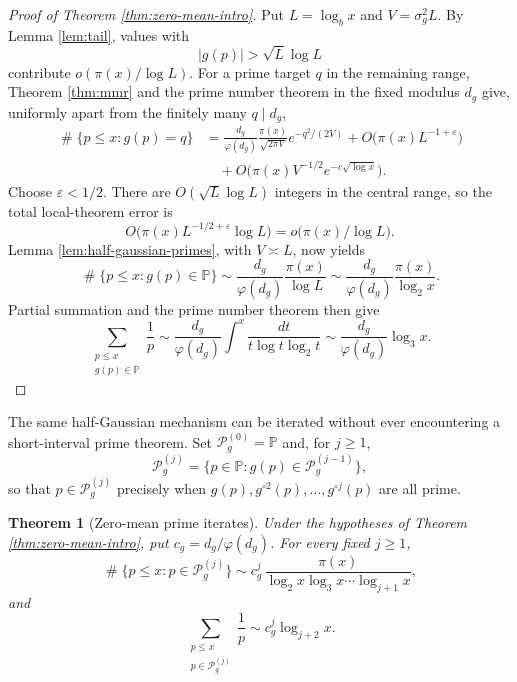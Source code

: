 \documentclass[11pt,reqno]{amsart}
\theoremstyle{plain}
\newtheorem{theorem}{Theorem}[section]
\theoremstyle{definition}
\newcommand{\Pp}{\mathbb{P}}
\newcommand{\eps}{\varepsilon}
\newcommand{\1}{\mathbf 1}
\DeclareMathOperator{\Card}{\#}
\begin{document}
\begin{proof}[Proof of Theorem \ref{thm:zero-mean-intro}]
Put $L=\log_bx$ and $V=\sigma_g^2L$.  By Lemma \ref{lem:tail}, values with
\[
 |g(p)|>\sqrt L\log L
\]
contribute $o(\pi(x)/\log L)$.  For a prime target $q$ in the remaining range, Theorem \ref{thm:mmr} and the prime number theorem in the fixed modulus $d_g$ give, uniformly apart from the finitely many $q\mid d_g$,
\begin{align*}
 \Card\{p\le x:g(p)=q\}
 &=\frac{d_g}{\varphi(d_g)}
  \frac{\pi(x)}{\sqrt{2\pi V}}e^{-q^2/(2V)}
  +O\big(\pi(x)L^{-1+\eps}\big)\\
 &\quad+O\big(\pi(x)V^{-1/2}e^{-c\sqrt{\log x}}\big).
\end{align*}
Choose $\eps<1/2$.  There are $O(\sqrt L\log L)$ integers in the central range, so the total local-theorem error is
\[
 O\big(\pi(x)L^{-1/2+\eps}\log L\big)
 =o\big(\pi(x)/\log L\big).
\]
Lemma \ref{lem:half-gaussian-primes}, with $V\asymp L$, now yields
\[
 \Card\{p\le x:g(p)\in\Pp\}
 \sim \frac{d_g}{\varphi(d_g)}\frac{\pi(x)}{\log L}
 \sim \frac{d_g}{\varphi(d_g)}\frac{\pi(x)}{\log_2x}.
\]
Partial summation and the prime number theorem then give
\[
 \sum_{\substack{p\le x\\g(p)\in\Pp}}\frac1p
 \sim \frac{d_g}{\varphi(d_g)}
 \int^x\frac{dt}{t\log t\log_2t}
 \sim \frac{d_g}{\varphi(d_g)}\log_3x.
\]
\end{proof}

The same half-Gaussian mechanism can be iterated without ever encountering a short-interval prime theorem.  Set $\mathcal P_g^{(0)}=\Pp$ and, for $j\ge1$,
\[
 \mathcal P_g^{(j)}=\{p\in\Pp:g(p)\in\mathcal P_g^{(j-1)}\},
\]
so that $p\in\mathcal P_g^{(j)}$ precisely when
$g(p),g^{\circ2}(p),\ldots,g^{\circ j}(p)$
are all prime.

\begin{theorem}[Zero-mean prime iterates]\label{thm:zero-iterates}
Under the hypotheses of Theorem \ref{thm:zero-mean-intro}, put
$c_g=d_g/\varphi(d_g)$.  For every fixed $j\ge1$,
\begin{equation}\label{eq:zero-iterate-count}
 \Card\{p\le x:p\in\mathcal P_g^{(j)}\}
 \sim c_g^j\,\frac{\pi(x)}{\log_2x\log_3x\cdots\log_{j+1}x},
\end{equation}
and
\begin{equation}\label{eq:zero-iterate-mertens}
 \sum_{\substack{p\le x\\p\in\mathcal P_g^{(j)}}}\frac1p
 \sim c_g^j\log_{j+2}x.
\end{equation}
\end{theorem}
\end{document}

